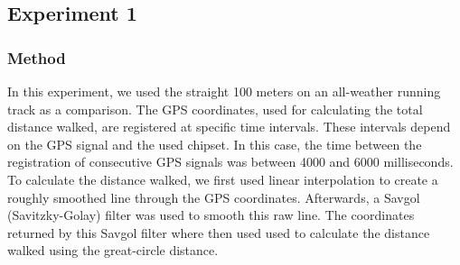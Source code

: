 \subsection{Experiment 1}

\subsubsection{Method}
In this experiment, we used the straight 100 meters on an all-weather running track as a comparison. The GPS coordinates, used for calculating the total distance walked, are registered at specific time intervals.
These intervals depend on the GPS signal and the used chipset. 
In this case, the time between the registration of consecutive GPS signals was between 4000 and 6000 milliseconds.
To calculate the distance walked, we first used linear interpolation to create a roughly smoothed line through the GPS coordinates.
Afterwards, a Savgol (Savitzky-Golay) filter \cite{press1990savitzky} was used to smooth this raw line. 
The coordinates returned by this Savgol filter where then used used to calculate the distance walked using the great-circle distance.

